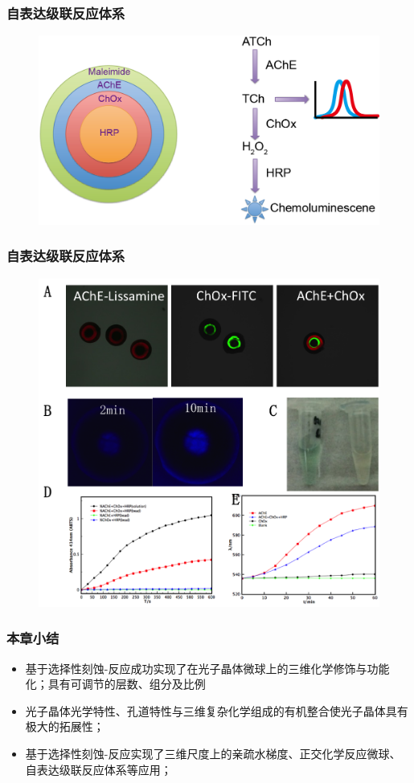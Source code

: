 \documentclass{beamer}
\begin{document}
\begin{frame}
  \frametitle{自表达级联反应体系}
  \begin{figure}
    \begin{center}
      \includegraphics[width=0.8\linewidth]{figures/ch3/cascade.png}
    \end{center}
  \end{figure}
\end{frame}
\begin{frame}
  \frametitle{自表达级联反应体系}
  \begin{figure}
    \begin{center}
      \includegraphics[width=0.65\linewidth]{figures/ch3/Figure5.png}
    \end{center}
  \end{figure}
\end{frame}

\begin{frame}
  \frametitle{本章小结}
  \begin{itemize}[<+-| alert@+>]
    \item
    基于选择性刻蚀-反应成功实现了在光子晶体微球上的三维化学修饰与功能化；具有可调节的层数、组分及比例
    \item
    光子晶体光学特性、孔道特性与三维复杂化学组成的有机整合使光子晶体具有极大的拓展性；
    \item
    基于选择性刻蚀-反应实现了三维尺度上的亲疏水梯度、正交化学反应微球、自表达级联反应体系等应用；
  \end{itemize}
\end{frame}
\end{document}

